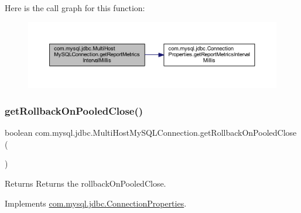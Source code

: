 Here is the call graph for this function\+:
\nopagebreak
\begin{figure}[H]
\begin{center}
\leavevmode
\includegraphics[width=350pt]{classcom_1_1mysql_1_1jdbc_1_1_multi_host_my_s_q_l_connection_a8b847e33c04c41470b7ee6e10dafa60f_cgraph}
\end{center}
\end{figure}
\mbox{\label{classcom_1_1mysql_1_1jdbc_1_1_multi_host_my_s_q_l_connection_a6e4539fdcc9a9aaa023d2902f1fbb1ef}} 
\subsubsection{\texorpdfstring{get\+Rollback\+On\+Pooled\+Close()}{getRollbackOnPooledClose()}}
{\footnotesize\ttfamily boolean com.\+mysql.\+jdbc.\+Multi\+Host\+My\+S\+Q\+L\+Connection.\+get\+Rollback\+On\+Pooled\+Close (\begin{DoxyParamCaption}{ }\end{DoxyParamCaption})}

\begin{DoxyReturn}{Returns}
Returns the rollback\+On\+Pooled\+Close. 
\end{DoxyReturn}


Implements \mbox{\hyperlink{interfacecom_1_1mysql_1_1jdbc_1_1_connection_properties_a8b670aa700956797a853c145974cd285}{com.\+mysql.\+jdbc.\+Connection\+Properties}}.

